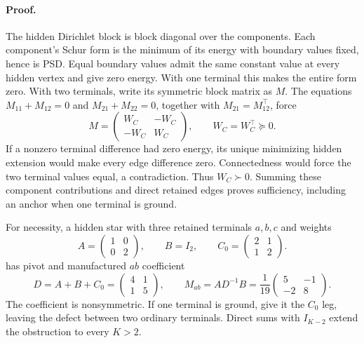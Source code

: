 \paragraph{Proof.}
The hidden Dirichlet block is block diagonal over the components.
Each component's Schur form is the minimum of its energy with
boundary values fixed, hence is PSD. Equal boundary values admit
the same constant value at every hidden vertex and give zero energy.
With one terminal this makes the entire form zero. With two terminals,
write its symmetric block matrix as \(M\). The equations
\(M_{11}+M_{12}=0\) and \(M_{21}+M_{22}=0\), together with
\(M_{21}=M_{12}^\top\), force
\begin{equation}
M=\begin{pmatrix}W_C&-W_C\\-W_C&W_C\end{pmatrix},
\qquad W_C=W_C^\top\succeq0.
\label{eq:cg-kron-two-terminal-response}
\end{equation}
If a nonzero terminal difference had zero energy, its unique minimizing
hidden extension would make every edge difference zero. Connectedness
would force the two terminal values equal, a contradiction. Thus
\(W_C\succ0\). Summing these component contributions and direct
retained edges proves sufficiency, including an anchor when one
terminal is ground.

For necessity, a hidden star with three retained terminals \(a,b,c\)
and weights
\begin{equation}
A=\begin{pmatrix}1&0\\0&2\end{pmatrix},\qquad
B=I_2,\qquad
C_0=\begin{pmatrix}2&1\\1&2\end{pmatrix}.
\label{eq:cg-kron-three-terminal-weights}
\end{equation}
has pivot and manufactured \(ab\) coefficient
\begin{equation}
D=A+B+C_0=\begin{pmatrix}4&1\\1&5\end{pmatrix},\qquad
M_{ab}=AD^{-1}B=
\frac1{19}\begin{pmatrix}5&-1\\-2&8\end{pmatrix}.
\label{eq:cg-kron-three-terminal-defect}
\end{equation}
The coefficient is nonsymmetric. If one terminal is ground,
give it the \(C_0\) leg, leaving the defect between two ordinary
terminals. Direct sums with \(I_{K-2}\) extend the obstruction to
every \(K>2\).

